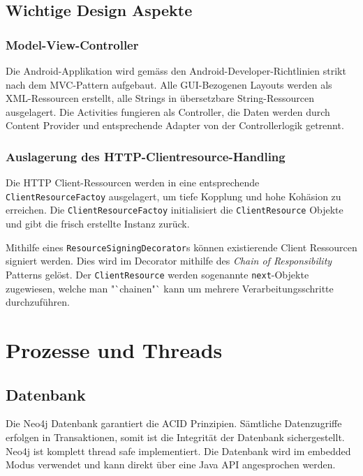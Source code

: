 \documentclass[10pt,a4paper]{scrartcl}
\begin{document}
\subsection{Wichtige Design Aspekte}

\subsubsection*{Model-View-Controller}

Die Android-Applikation wird gemäss den Android-Developer-Richtlinien strikt nach dem
MVC-Pattern aufgebaut. Alle GUI-Bezogenen Layouts werden als XML-Ressourcen erstellt, alle Strings
in übersetzbare String-Ressourcen ausgelagert. Die Activities fungieren als Controller, die Daten
werden durch Content Provider und entsprechende Adapter von der Controllerlogik getrennt.

\subsubsection*{Auslagerung des HTTP-Clientresource-Handling}

Die HTTP Client-Ressourcen werden in eine entsprechende \texttt{ClientResourceFactoy}
ausgelagert, um tiefe Kopplung und hohe Kohäsion zu erreichen. Die \texttt{ClientResourceFactoy}
initialisiert die \texttt{ClientResource} Objekte und gibt die frisch erstellte Instanz zurück.

Mithilfe eines \texttt{ResourceSigningDecorator}s können existierende Client Ressourcen signiert
werden. Dies wird im Decorator mithilfe des \textit{Chain of Responsibility} Patterns gelöst. Der
\texttt{ClientResource} werden sogenannte \texttt{next}-Objekte zugewiesen, welche man "`chainen"`
kann um mehrere Verarbeitungsschritte durchzuführen.


\newpage
\section{Prozesse und Threads}

\subsection{Datenbank}

Die Neo4j Datenbank garantiert die ACID Prinzipien.
Sämtliche Datenzugriffe erfolgen in Transaktionen, somit ist die Integrität der Datenbank
sichergestellt.
Neo4j ist komplett thread safe implementiert.  Die Datenbank wird im
embedded Modus verwendet und kann direkt über eine Java API angesprochen werden.
\end{document}
